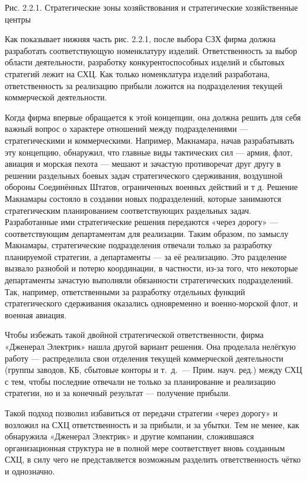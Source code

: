 Рис. 2.2.1. Стратегические зоны хозяйствования и стратегические хозяйственные центры

Как показывает нижняя часть рис. 2.2.1, после выбора СЗХ фирма должна разработать соответствующую номенклатуру изделий. Ответственность за выбор области деятельности, разработку конкурентоспособных изделий и сбытовых стратегий лежит на СХЦ. Как только номенклатура изделий разработана, ответственность за реализацию прибыли ложится на подразделения текущей коммерческой деятельности.

Когда фирма впервые обращается к этой концепции, она должна решить для себя важный вопрос о характере отношений между подразделениями — стратегическими и коммерческими. Например, Макнамара, начав разрабатывать эту концепцию, обнаружил, что главные виды тактических сил — армия, флот, авиация и морская пехота — мешают и зачастую противоречат друг другу в решении раздельных боевых задач стратегического сдерживания, воздушной обороны Соединённых Штатов, ограниченных военных действий и т д. Решение Макнамары состояло в создании новых подразделений, которые занимаются стратегическим планированием соответствующих раздельных задач. Разработанные ими стратегические решения передаются «через дорогу» — соответствующим департаментам для реализации. Таким образом, по замыслу Макнамары, стратегические подразделения отвечали только за разработку планируемой стратегии, а департаменты — за её реализацию. Это разделение вызвало разнобой и потерю координации, в частности, из-за того, что некоторые департаменты зачастую выполняли обязанности стратегических подразделений. Так, например, ответственными за разработку отдельных функций стратегического сдерживания оказались одновременно и военно-морской флот, и военная авиация.

Чтобы избежать такой двойной стратегической ответственности, фирма «Дженерал Электрик» нашла другой вариант решения. Она проделала нелёгкую работу — распределила свои отделения текущей коммерческой деятельности (группы заводов, КБ, сбытовые конторы и т. д. — Прим. науч. ред.) между СХЦ с тем, чтобы последние отвечали не только за планирование и реализацию стратегии, но и за конечный результат — получение прибыли.

Такой подход позволил избавиться от передачи стратегии «через дорогу» и возложил на СХЦ ответственность и за прибыли, и за убытки. Тем не менее, как обнаружила «Дженерал Электрик» и другие компании, сложившаяся организационная структура не в полной мере соответствует вновь созданным СХЦ, в силу чего не представляется возможным разделить ответственность чётко и однозначно.

